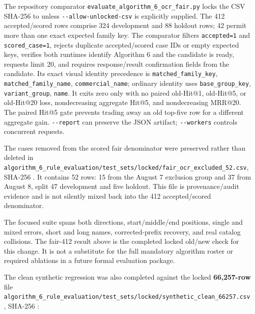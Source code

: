 The repository comparator \texttt{evaluate\_\allowbreak{}algorithm\_\allowbreak{}6\_\allowbreak{}ocr\_\allowbreak{}fair.py} locks the CSV SHA-256 to \texttt{} unless \texttt{-\/-allow-unlocked-csv} is explicitly supplied. The 412 accepted/scored rows comprise 324 development and 88 holdout rows; 42 permit more than one exact expected family key. The comparator filters \texttt{accepted=1} and \texttt{scored\_\allowbreak{}case=1}, rejects duplicate accepted/scored case IDs or empty expected keys, verifies both runtimes identify Algorithm 6 and the candidate is ready, requests limit 20, and requires response/result confirmation fields from the candidate. Its exact visual identity precedence is \texttt{matched\_\allowbreak{}family\_\allowbreak{}key}, \texttt{matched\_\allowbreak{}family\_\allowbreak{}name}, \texttt{commercial\_\allowbreak{}name}; ordinary identity uses \texttt{base\_\allowbreak{}group\_\allowbreak{}key}, \texttt{variant\_\allowbreak{}group}, \texttt{name}. It exits zero only with no paired old-Hit@1, old-Hit@5, or old-Hit@20 loss, nondecreasing aggregate Hit@5, and nondecreasing MRR@20. The paired Hit@5 gate prevents trading away an old top-five row for a different aggregate gain. \texttt{-\/-report} can preserve the JSON artifact; \texttt{-\/-workers} controls concurrent requests.

The cases removed from the scored fair denominator were preserved rather than deleted in \texttt{algorithm\_\allowbreak{}6\_\allowbreak{}rule\_\allowbreak{}evaluation/test\_\allowbreak{}sets/locked/fair\_\allowbreak{}ocr\_\allowbreak{}excluded\_\allowbreak{}52.csv}, SHA-256 \texttt{}. It contains 52 rows: 15 from the August 7 exclusion group and 37 from August 8, split 47 development and five holdout. This file is provenance/audit evidence and is not silently mixed back into the 412 accepted/scored denominator.

The focused suite spans both directions, start/middle/end positions, single and mixed errors, short and long names, corrected-prefix recovery, and real catalog collisions. The fair-412 result above is the completed locked old/new check for this change. It is not a substitute for the full mandatory algorithm roster or required ablations in a future formal evaluation package.

The clean synthetic regression was also completed against the locked \textbf{66,257-row} file \texttt{algorithm\_\allowbreak{}6\_\allowbreak{}rule\_\allowbreak{}evaluation/test\_\allowbreak{}sets/locked/synthetic\_\allowbreak{}clean\_\allowbreak{}66257.csv}, SHA-256 \texttt{}:


